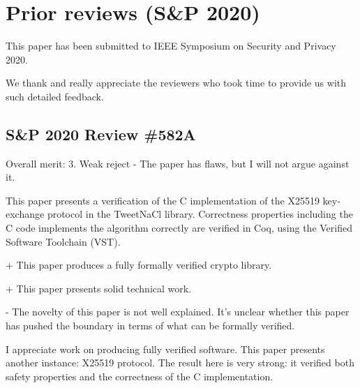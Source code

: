 \newpage

\section{Prior reviews (S\&P 2020)}
\label{appendix:past-reviews}

This paper has been submitted to IEEE Symposium on Security and Privacy 2020.

We thank and really appreciate the reviewers who took time to provide us with
such detailed feedback.

\subsection{S\&P 2020 Review \#582A}

Overall merit: 3. Weak reject - The paper has flaws, but I will
not argue against it.

\begin{center}
\end{center}

This paper presents a verification of the C implementation
of the X25519 key-exchange protocol in the TweetNaCl
library. Correctness properties including the C code implements
the algorithm correctly are verified in Coq, using the
Verified Software Toolchain (VST).


\begin{center}
\end{center}

+ This paper produces a fully formally verified crypto library.

+ This paper presents solid technical work.


\begin{center}
\end{center}

- The novelty of this paper is not well explained. It’s unclear
whether this paper has pushed the boundary in terms of what
can be formally verified.


\begin{center}
\end{center}

I appreciate work on producing fully verified software. This
paper presents another instance: X25519 protocol. The result
here is very strong: it verified both safety properties and the
correctness of the C implementation.

